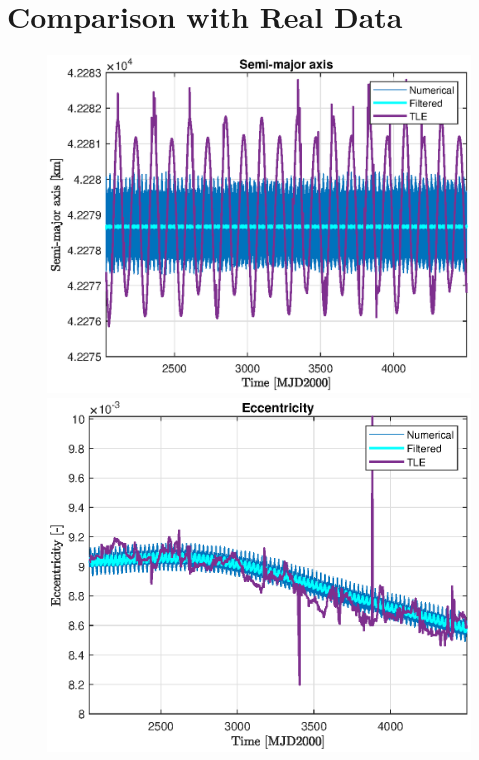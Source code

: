 \section{Comparison with Real Data}
\label{sec:comparison}

\newcommand{\n}{0.7}

\begin{figure}[H]
	\begin{minipage}{0.48\linewidth}
		\centering
		\includegraphics[width=\n\linewidth]{a_TLE.eps}
	\end{minipage}\hfill
	\begin{minipage}{0.48\linewidth}
		\centering
		\includegraphics[width=\n\linewidth]{e_TLE.eps}

\end{minipage}
\end{figure}
